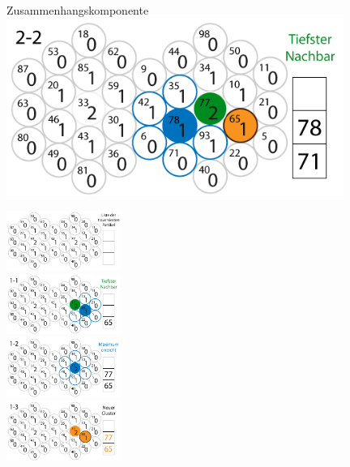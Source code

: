 \documentclass[10pt]{beamer}
\begin{document}
%
%
\begin{frame}{Zusammenhangskomponente}
	\includegraphics*[width=11cm]{media/cluster/cfd.png} \\
\end{frame}

\begin{frame}
	\includegraphics*[width=3.7cm]{media/cluster/cfd000.png} \\
	\includegraphics*[width=3.7cm]{media/cluster/cfd001.png} \\
	\includegraphics*[width=3.7cm]{media/cluster/cfd002.png} \\
	\includegraphics*[width=3.7cm]{media/cluster/cfd003.png}
\end{frame}
\end{document}
